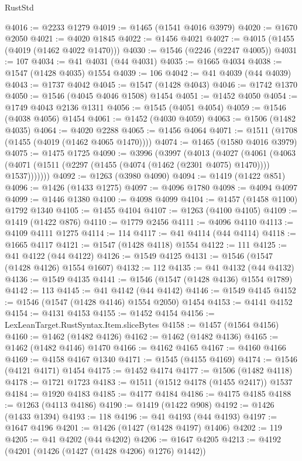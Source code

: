 \begin{lexlean}{RustStd}
\begin{coremodule}
@4016 := @2233 @1279
@4019 := @1465 (@1541 @4016 @3979)
@4020 := @1670 @2050
@4021 := @4020 @1845
@4022 := @1456 @4021
@4027 := @4015 (@1455 (@4019 (@1462 @4022 @1470)))
@4030 := @1546 (@2246 (@2247 @4005))
@4031 := 107
@4034 := @41 @4031 (@44 @4031)
@4035 := @1665 @4034
@4038 := @1547 (@1428 @4035) @1554
@4039 := 106
@4042 := @41 @4039 (@44 @4039)
@4043 := @1737 @4042
@4045 := @1547 (@1428 @4043)
@4046 := @1742 @1370
@4050 := @1546 (@4045 @4046 @1508) @1454
@4051 := @1452 @4050
@4054 := @1749 @4043 @2136 @1311
@4056 := @1545 (@4051 @4054)
@4059 := @1546 (@4038 @4056) @1454
@4061 := @1452 (@4030 @4059)
@4063 := @1506 (@1482 @4035)
@4064 := @4020 @2288
@4065 := @1456 @4064
@4071 := @1511 (@1708 (@1455 (@4019 (@1462 @4065 @1470))))
@4074 := @1465 (@1580 @4016 @3979)
@4075 := @1475 @1725
@4090 := @3996
    (@3997
      (@4013
        (@4027
          (@4061
            (@4063 (@4071 (@1511 (@2297 (@1455 (@4074 (@1462 (@2301 @4075) @1470)))) @1537)))))))
@4092 := @1263 (@3980 @4090)
@4094 := @1419 (@1422 @851)
@4096 := @1426 (@1433 @1275)
@4097 := @4096 @1780
@4098 := @4094 @4097
@4099 := @1446 @1380
@4100 := @4098 @4099
@4104 := @1457 (@1458 @1100) @1792 @1340
@4105 := @1455 @4104
@4107 := @1263 (@4100 @4105)
@4109 := @1419 (@1422 @876)
@4110 := @1779 @2456
@4111 := @4096 @4110
@4113 := @4109 @4111 @1275
@4114 := 114
@4117 := @41 @4114 (@44 @4114)
@4118 := @1665 @4117
@4121 := @1547 (@1428 @4118) @1554
@4122 := 111
@4125 := @41 @4122 (@44 @4122)
@4126 := @1549 @4125
@4131 := @1546 (@1547 (@1428 @4126) @1554 @1607)
@4132 := 112
@4135 := @41 @4132 (@44 @4132)
@4136 := @1549 @4135
@4141 := @1546 (@1547 (@1428 @4136) @1554 @1789)
@4142 := 113
@4145 := @41 @4142 (@44 @4142)
@4146 := @1549 @4145
@4152 := @1546 (@1547 (@1428 @4146) @1554 @2050) @1454
@4153 := @4141 @4152
@4154 := @4131 @4153
@4155 := @1452 @4154
@4156 := LexLeanTarget.RustSyntax.Item.sliceBytes
@4158 := @1457 (@1564 @4156)
@4160 := @1462 (@1482 @4126)
@4162 := @1462 (@1482 @4136)
@4165 := @1462 (@1482 @4146) @1470
@4166 := @4162 @4165
@4167 := @4160 @4166
@4169 := @4158 @4167 @1340
@4171 := @1545 (@4155 @4169)
@4174 := @1546 (@4121 @4171) @1454
@4175 := @1452 @4174
@4177 := @1506 (@1482 @4118)
@4178 := @1721 @1723
@4183 := @1511 (@1512 @4178 (@1455 @2417)) @1537
@4184 := @1920 @4183
@4185 := @4177 @4184
@4186 := @4175 @4185
@4188 := @1263 (@4113 @4186)
@4190 := @1419 (@1422 @908)
@4192 := @1426 (@1433 @1394)
@4193 := 118
@4196 := @41 @4193 (@44 @4193)
@4197 := @1647 @4196
@4201 := @1426 (@1427 (@1428 @4197) @1406)
@4202 := 119
@4205 := @41 @4202 (@44 @4202)
@4206 := @1647 @4205
@4213 := @4192 (@4201 (@1426 (@1427 (@1428 @4206) @1276) @1442))

\end{coremodule}
\end{lexlean}
